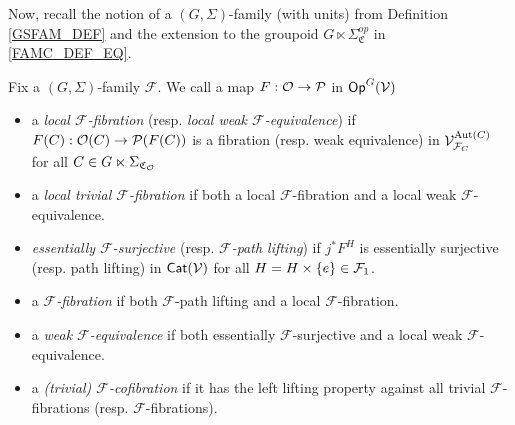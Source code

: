 \documentclass[a4paper,10pt
,draft
]{article}%
\renewcommand{\F}{\mathcal F}
\renewcommand{\1}{\eta}%
\begin{document}
Now, recall the notion of a $(G, \Sigma)$-family (with units) from Definition \ref{GSFAM_DEF}
and the extension to the groupoid $G \ltimes \Sigma_{\mathfrak C}^{op}$ in \eqref{FAMC_DEF_EQ}.


\begin{definition}
      \label{MODEL_DEFN}
      Fix a $(G, \Sigma)$-family $\F$.
      We call a map $F: \mathcal{O} \to \mathcal{P}$ in $\mathsf{Op}^G(\mathcal V)$
      \begin{itemize}
      \item a {\em local $\F$-fibration} (resp. {\em local weak $\F$-equivalence}) if
            $F(C): \mathcal{O}(C)\to \mathcal{P}(F(C))$
            is a fibration (resp. weak equivalence) in $\V^{\Aut(C)}_{\F_C}$ for all $C \in G \ltimes \Sigma_{\mathfrak C_{\mathcal{O}}}$
      \item a {\em local trivial $\F$-fibration} if both a local $\F$-fibration and a local weak $\F$-equivalence.
      \item {\em essentially $\F$-surjective} (resp. {\em $\F$-path lifting}) if $j^*F^H$ is essentially surjective (resp. path lifting) in $\mathsf{Cat}(\mathcal V)$ for all $H = H \times \set{e} \in \F_1$.
      \item a {\em $\F$-fibration} if both $\F$-path lifting and a local $\F$-fibration.
      \item a {\em weak $\F$-equivalence} if both essentially $\F$-surjective and a local weak $\F$-equivalence.
      \item a \textit{(trivial) $\F$-cofibration} if it has the left lifting property against all trivial $\F$-fibrations (resp. $\F$-fibrations).
      \end{itemize}
\end{definition}

\end{document}
